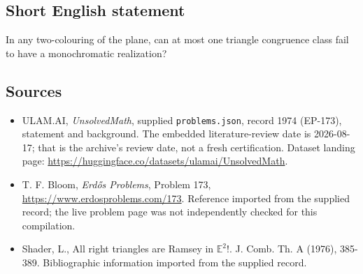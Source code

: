 \documentclass[11pt,a4paper]{article}
\begin{document}
\subsection{Short English statement}

In any two-colouring of the plane, can at most one triangle congruence class fail to have a monochromatic realization?

\subsection{Sources}

{\small

\begin{itemize}

\item[\hypertarget{source:1974:1}{S1}] ULAM.AI, \emph{UnsolvedMath}, supplied \texttt{problems.json}, record 1974 (EP-173), statement and background. The embedded literature-review date is 2026-08-17; that is the archive’s review date, not a fresh certification. Dataset landing page: \url{https://huggingface.co/datasets/ulamai/UnsolvedMath}.

\item[\hypertarget{source:1974:2}{S2}] T. F. Bloom, \emph{Erdős Problems}, Problem 173, \url{https://www.erdosproblems.com/173}. Reference imported from the supplied record; the live problem page was not independently checked for this compilation.

\item[\hypertarget{source:1974:3}{S3}] Shader, L., All right triangles are Ramsey in $\mathbb{E}^2$!. J. Comb. Th. A (1976), 385-389. Bibliographic information imported from the supplied record.

\end{itemize}

}

\label{end:1974}
\end{document}
